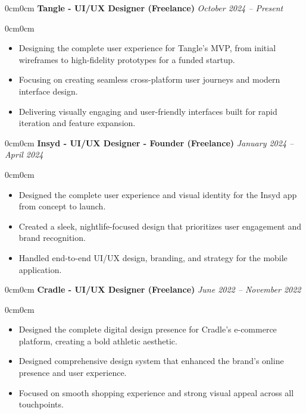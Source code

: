 \documentclass[10pt, letterpaper]{article}
\newenvironment{highlights}{\begin{itemize}[topsep=0.10 cm, parsep=0.10 cm, partopsep=0pt, itemsep=0pt, leftmargin=10pt]}{\end{itemize}}
\newenvironment{onecolentry}{\begin{adjustwidth}{0cm}{0cm}}{\end{adjustwidth}}
\begin{document}
\vspace{0.2 cm}
\begin{onecolentry}
    \textbf{Tangle - UI/UX Designer (Freelance)} \hfill \textit{October 2024 -- Present}
\end{onecolentry}
\vspace{0.2 cm}
\begin{onecolentry}
    \begin{highlights}
        \item Designing the complete user experience for Tangle's MVP, from initial wireframes to high-fidelity prototypes for a funded startup.
        \item Focusing on creating seamless cross-platform user journeys and modern interface design.
        \item Delivering visually engaging and user-friendly interfaces built for rapid iteration and feature expansion.
    \end{highlights}
\end{onecolentry}

\vspace{0.2 cm}
\begin{onecolentry}
    \textbf{Insyd - UI/UX Designer - Founder (Freelance)} \hfill \textit{January 2024 -- April 2024}
\end{onecolentry}
\vspace{0.2 cm}
\begin{onecolentry}
    \begin{highlights}
        \item Designed the complete user experience and visual identity for the Insyd app from concept to launch.
        \item Created a sleek, nightlife-focused design that prioritizes user engagement and brand recognition.
        \item Handled end-to-end UI/UX design, branding, and strategy for the mobile application.
    \end{highlights}
\end{onecolentry}

\vspace{0.2 cm}
\begin{onecolentry}
    \textbf{Cradle - UI/UX Designer (Freelance)} \hfill \textit{June 2022 -- November 2022}
\end{onecolentry}
\vspace{0.2 cm}
\begin{onecolentry}
    \begin{highlights}
        \item Designed the complete digital design presence for Cradle's e-commerce platform, creating a bold athletic aesthetic.
        \item Designed comprehensive design system that enhanced the brand's online presence and user experience.
        \item Focused on smooth shopping experience and strong visual appeal across all touchpoints.
    \end{highlights}
\end{onecolentry}
\end{document}

